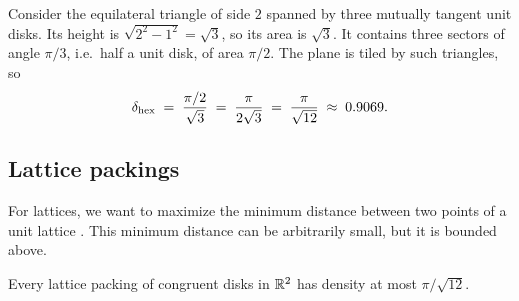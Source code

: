 \begin{example}
\label{L1:ex:hex}
Consider the equilateral triangle of side $2$ spanned by three mutually tangent unit disks.
Its height is $\sqrt{2^2-1^2}=\sqrt3$, so its area is $\sqrt3$. It contains three
sectors of angle $\pi/3$, i.e.\ half a unit disk, of area $\pi/2$. The plane is tiled by
such triangles, so
\[
  \delta_{\mathrm{hex}}\;=\;\frac{\pi/2}{\sqrt3}\;=\;\frac{\pi}{2\sqrt3}\;=\;\frac{\pi}{\sqrt{12}}\;\approx\;0.9069 .
\]
\end{example}

\subsection{Lattice packings}

For lattices, we want to maximize the minimum distance between two points of a unit lattice
.
This minimum distance can be arbitrarily small, but it is bounded above.

\begin{theorem}
\label{L1:thm:lattice2}
Every lattice packing of congruent disks in $\mathbb{R}^2$ has density at most $\pi/\sqrt{12}$.
\end{theorem}

